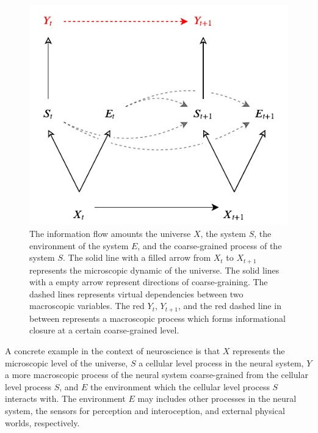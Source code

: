 \documentclass[utf8]{article}
\begin{document}
		\begin{figure}[H]
		    \centering
			\includegraphics[width=\textwidth]{WritingMaterials/Fig_FullGraph/FullGraph.pdf}
			\caption{The information flow amounts the universe $X$, the system $S$, the environment of the system $E$, and the coarse-grained process of the system $S$. The solid line with a filled arrow from $X_t$ to $X_{t+1}$ represents the microscopic dynamic of the universe. The solid lines with a empty arrow represent directions of coarse-graining. The dashed lines represents virtual dependencies between  two macroscopic variables. The red $Y_t$, $Y_{t+1}$, and the red dashed line in between represents a macroscopic process which forms informational closure at a certain coarse-grained level.}
			\label{fig:fullgraph}
	   	\end{figure}
       
        A concrete example in the context of neuroscience is that $X$ represents the microscopic level of the universe, $S$ a cellular level process in the neural system, $Y$ a more macroscopic process of the neural system coarse-grained from the cellular level process $S$, and $E$ the environment which the cellular level process $S$ interacts with. The environment $E$ may includes other processes in the neural system, the sensors for perception and interoception, and external physical worlds, respectively.	   	
        
\end{document}
